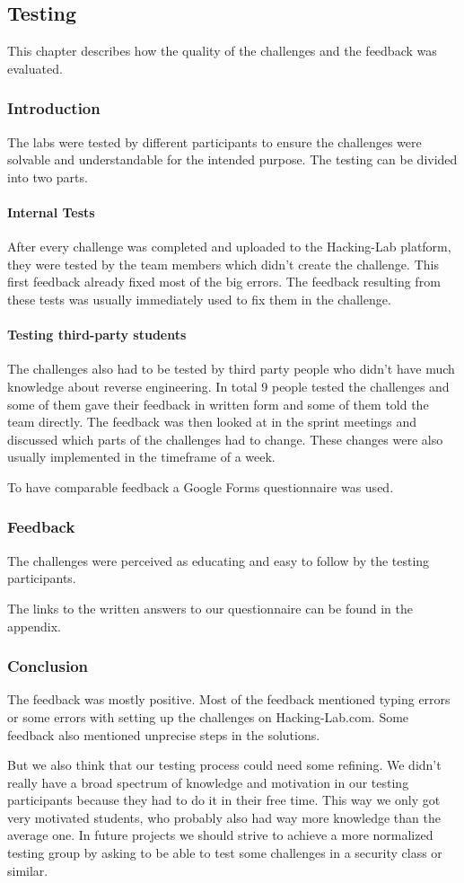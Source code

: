 \subsection{Testing}
This chapter describes how the quality of the challenges and the feedback was evaluated.

\subsubsection{Introduction}
The labs were tested by different participants to ensure the challenges were solvable and understandable for the intended purpose. The testing can be divided into two parts.

\paragraph{Internal Tests}
After every challenge was completed and uploaded to the Hacking-Lab platform, they were tested by the team members which didn't create the challenge. This first feedback already fixed most of the big errors. The feedback resulting from these tests was usually immediately used to fix them in the challenge.

\paragraph{Testing third-party students}
The challenges also had to be tested by third party people who didn't have much knowledge about reverse engineering. In total 9 people tested the challenges and some of them gave their feedback in written form and some of them told the team directly. The feedback was then looked at in the sprint meetings and discussed which parts of the challenges had to change. These changes were also usually implemented in the timeframe of a week.

To have comparable feedback a Google Forms questionnaire was used.

\subsubsection{Feedback}
The challenges were perceived as educating and easy to follow by the testing participants.

The links to the written answers to our questionnaire can be found in the appendix.

\subsubsection{Conclusion}
The feedback was mostly positive. Most of the feedback mentioned typing errors or some errors with setting up the challenges on Hacking-Lab.com. Some feedback also mentioned unprecise steps in the solutions.

But we also think that our testing process could need some refining. We didn't really have a broad spectrum of knowledge and motivation in our testing participants because they had to do it in their free time. This way we only got very motivated students, who probably also had way more knowledge than the average one. In future projects we should strive to achieve a more normalized testing group by asking to be able to test some challenges in a security class or similar.